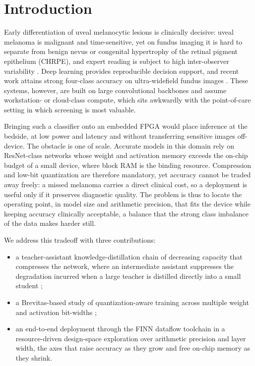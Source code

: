 \section{Introduction}
\label{sec:introduction}

Early differentiation of uveal melanocytic lesions is clinically decisive: uveal
melanoma is malignant and time-sensitive, yet on fundus imaging it is hard to
separate from benign nevus or congenital hypertrophy of the retinal pigment
epithelium (CHRPE), and expert reading is subject to high inter-observer
variability \cite{chadwick2025ai}. Deep learning provides reproducible decision support, and recent
work attains strong four-class accuracy on ultra-widefield fundus images
\cite{tasso2026lesion}. These systems, however, are built on large convolutional
backbones and assume workstation- or cloud-class compute, which sits awkwardly
with the point-of-care setting in which screening is most valuable.

Bringing such a classifier onto an embedded FPGA would place inference at the
bedside, at low power and latency and without transferring sensitive images
off-device. The obstacle is one of scale. Accurate models in this domain rely on
ResNet-class networks whose weight and activation memory exceeds the on-chip
budget of a small device, where block RAM is the binding resource. Compression and low-bit quantization are therefore
mandatory, yet accuracy cannot be traded away freely: a missed melanoma carries a
direct clinical cost, so a deployment is useful only if it preserves diagnostic
quality. The problem is thus to locate the operating point, in model size and
arithmetic precision, that fits the device while keeping accuracy clinically
acceptable, a balance that the strong class imbalance of the data makes harder
still.

We address this tradeoff with three contributions:
\begin{itemize}
\item a teacher-assistant knowledge-distillation chain of decreasing capacity that
  compresses the network, where an intermediate assistant suppresses the
  degradation incurred when a large teacher is distilled directly into a small
  student \cite{hinton2015distilling, cho2019efficacy, mirzadeh2020takd};
\item a Brevitas-based study of quantization-aware training across multiple
  weight and activation bit-widths \cite{pappalardo2023brevitas};
\item an end-to-end deployment through the FINN dataflow toolchain
  \cite{umuroglu2017finn, blott2018finnr} in a resource-driven design-space
  exploration over arithmetic precision and layer width, the axes that raise
  accuracy as they grow and free on-chip memory as they shrink.
\end{itemize}

